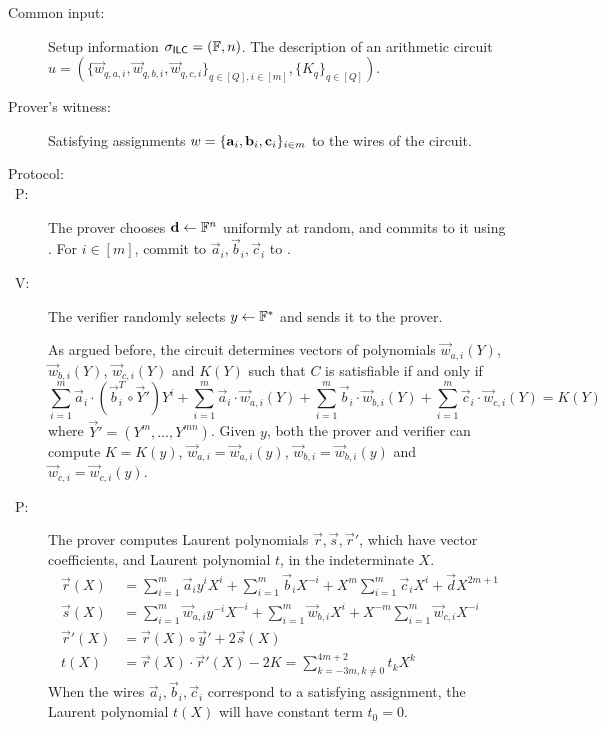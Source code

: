 \begin{description}
\item[Common input:] Setup information $\mathsf{\sigma}_{\mathsf{ILC}} = (\mathbb{F},n)$. The description of an arithmetic circuit $u = \left( \{\vec{w}_{q,{a,i}},\vec{w}_{q,{b,i}},\vec{w}_{q,{c,i}}\}_{q \in [Q], i \in [m]}, \{K_{q}\}_{q \in [Q]}\right)$.
\item[Prover's witness:] Satisfying assignments $w = \{\mathbf{a}_i,\mathbf{b}_i,\mathbf{c}_i\}_{i \in m}$ to the wires of the circuit.
\item[Protocol:]
\item[\ P:]
The prover chooses $\mathbf{d} \gets \mathbb{F}^n$ uniformly at random, and commits to it using \ILCcommit. For $i \in [m]$, commit to $\vec{a}_{i},\vec{b}_{i},\vec{c}_{i}$ to \ILCcommit.

\item[\ V:] The verifier randomly selects $y\gets \mathbb{F}^*$ and sends it to the prover.

As argued before, the circuit determines vectors of polynomials $\vec{w}_{a,i}(Y)$, $\vec{w}_{b,i}(Y)$, $\vec{w}_{c,i}(Y)$ and $K(Y)$ such that $C$ is satisfiable if and only if 
$$
\sum_{i=1}^m  \vec{a}_i  \cdot (\vec{b}_i^T \circ \vec{Y}') Y^i+\sum_{i=1}^m \vec{a}_i  \cdot \vec{w}_{a,i}(Y)
+
\sum_{i=1}^m \vec{b}_i \cdot \vec{w}_{b,i}(Y)   +\sum_{i=1}^m \vec{c}_i \cdot \vec{w}_{c,i}(Y) =  K(Y)
$$
where $\vec{Y}'=(Y^m,\ldots,Y^{mn})$. Given $y$, both the prover and verifier can compute $K=K(y)$, $\vec{w}_{a,i}=\vec{w}_{a,i}(y)$, $\vec{w}_{b,i}=\vec{w}_{b,i}(y)$ and $\vec{w}_{c,i}=\vec{w}_{c,i}(y)$.

\item[\ P:] The prover computes Laurent polynomials $\vec{r},\vec{s},\vec{r}'$, which have vector coefficients, and Laurent polynomial $t$, in the indeterminate $X$.
\begin{align*}
\vec{r}(X)&=\sum_{i=1}^m\vec{a}_{i}y^i X^{i}+\sum_{i=1}^m\vec{b}_{i} X^{-i}+X^m \sum_{i=1}^m\vec{c}_{i} X^{i}+\vec{d}X^{2m+1}\\
\vec{s}(X)&=\sum_{i=1}^m\vec{w}_{a,i}y^{-i} X^{-i}+\sum_{i=1}^m\vec{w}_{b,i}X^{i}+ X^{-m} \sum_{i=1}^m\vec{w}_{c,i}X^{-i}\\
\vec{r}'(X)&= \vec{r}(X) \circ \vec{y}' + 2\vec{s}(X)\\
 t(X)&=\vec{r}(X)\cdot \vec{r}'(X)-2K=\sum_{k=-3m,k \neq 0}^{4m+2}t_kX^{k}
\end{align*}
When the wires $\vec{a}_{i},\vec{b}_i,\vec{c}_i$ correspond to a satisfying assignment, the Laurent polynomial $t(X)$ will have constant term $t_0=0$. 


\end{description}
